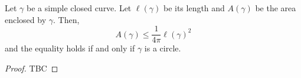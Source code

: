 \documentclass[11pt]{penrose}
\begin{document}
\begin{nthm}
    Let $\gamma$ be a simple closed curve. Let $\ell(\gamma)$ be its length and $A(\gamma)$ be the area enclosed by $\gamma$. Then,
    \begin{equation}
        A(\gamma) \leq \frac{1}{4\pi} \ell(\gamma)^2
    \end{equation}
    and the equality holds if and only if $\gamma$ is a circle.
\end{nthm}
\begin{proof}
    TBC
\end{proof}
\end{document}
